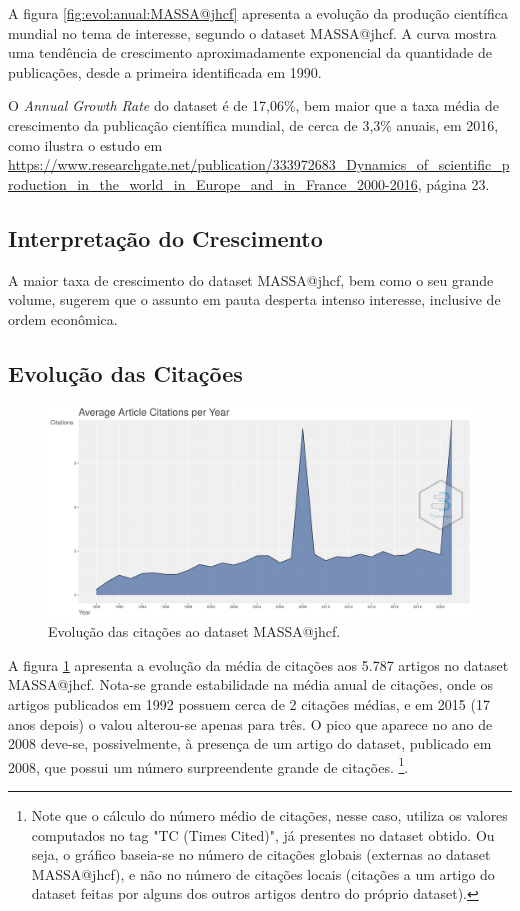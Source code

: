 A figura \ref{fig:evol:anual:MASSA@jhcf} apresenta a evolução da produção científica mundial no tema de interesse, segundo o dataset MASSA@jhcf. A curva mostra uma tendência de crescimento aproximadamente exponencial da quantidade de publicações, desde a primeira identificada em 1990.

O \textit{Annual Growth Rate} do dataset é de 17,06\%, bem maior que a taxa média de crescimento da publicação científica mundial, de cerca de 3,3\% anuais, em 2016, como ilustra o estudo em \url{https://www.researchgate.net/publication/333972683_Dynamics_of_scientific_production_in_the_world_in_Europe_and_in_France_2000-2016}, página 23.

\subsection{Interpretação do Crescimento} A maior taxa de crescimento do dataset MASSA@jhcf, bem como o seu grande volume, sugerem que o assunto em pauta desperta intenso interesse, inclusive de ordem econômica.

\subsection{Evolução das Citações}

\begin{figure}
    \centering
    \includegraphics[width=1\textwidth]{experiments/jhcf/PesqBibliogr/Computacao Experimental/WoS-20210803/classico-mais-citacoes/Dataset/AverageArticleCitationPerYear-2021-08-09.png}
    \caption{Evolução das citações ao dataset MASSA@jhcf.}
    \label{fig:evol:anual:citacoes:MASSA@jhcf}
\end{figure}

A figura \ref{fig:evol:anual:citacoes:MASSA@jhcf} apresenta a evolução da média de citações aos 5.787 artigos no dataset MASSA@jhcf. 
Nota-se grande estabilidade na média anual de citações, onde os artigos publicados em 1992 possuem cerca de 2 citações médias, e em 2015 (17 anos depois) o valou alterou-se apenas para três. O pico que aparece no ano de 2008 deve-se, possivelmente, à presença de um artigo do dataset, publicado em 2008, que possui um número surpreendente grande de citações. \footnote{Note que o cálculo do número  médio de citações, nesse caso, utiliza os valores computados no tag "TC (Times Cited)", já presentes no dataset obtido. Ou seja, o gráfico baseia-se no número de citações globais (externas ao dataset MASSA@jhcf), e não no número de citações locais (citações a um artigo do dataset feitas por alguns dos outros artigos dentro do próprio dataset).}.

